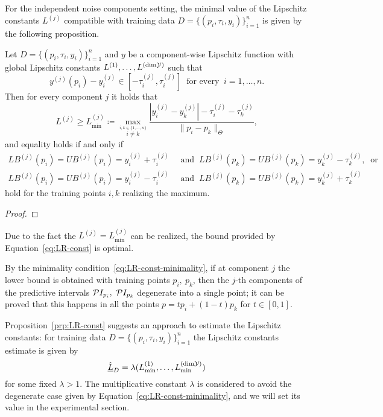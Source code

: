 For the independent noise components setting, the minimal value of the Lipschitz constants $L^{(j)}$ compatible with training data $D=\{ (p_i, \tau_i, y_i) \}_{i=1}^n$ is given by the following proposition.
\begin{prp} \label{prp:LR-const}
    Let $D=\{ (p_i, \tau_i, y_i) \}_{i=1}^n$ and $y$ be a component-wise Lipschitz function with global Lipschitz constants $L^{(1)},\dots, L^{(\text{dim}\mathcal Y)}$ such that 
    \[
        y^{(j)}(p_i) -y_i^{(j)} \in  [-\tau_i^{(j)},\tau_i^{(j)}] \ \text{ for every } \ i = 1, \dots, n.
    \]
    Then for every component $j$ it holds that
    \begin{equation}\label{eq:LR-const}
        L^{(j)} \geq L^{(j)}_{\min}\coloneq \max_{ \stackrel{i, k \in \{1, \dots, n\}}{i\neq k} } \frac{| y_i^{(j)} - y_k^{(j)} | - \tau_i^{(j)} - \tau_k^{(j)}}{\| p_i - p_k \|_\Theta},
    \end{equation}
    and equality holds if and only if
    \begin{equation}\label{eq:LR-const-minimality}
        \begin{aligned}
            LB^{(j)}(p_i) =UB^{(j)}(p_i) = y_i^{(j)} + \tau_i^{(j)}  \ &\text{ and }   \ LB^{(j)}(p_k) =UB^{(j)}(p_k) = y_k^{(j)} - \tau_k^{(j)}, \ \text{ or } \\
            LB^{(j)}(p_i) =UB^{(j)}(p_i) = y_i^{(j)} - \tau_i^{(j)}  \ &\text{ and }   \ LB^{(j)}(p_k) =UB^{(j)}(p_k) = y_k^{(j)} + \tau_k^{(j)}
        \end{aligned}
    \end{equation}
    hold for the training points $i,k$ realizing the maximum. 
\end{prp}
\begin{proof}
\end{proof}
\begin{rmk}
Due to the fact the $L^{(j)}=L^{(j)}_{\min}$ can be realized, the bound provided by Equation~\eqref{eq:LR-const} is optimal. 
\end{rmk}
\begin{rmk}
By the minimality condition~\eqref{eq:LR-const-minimality}, if at component $j$ the lower bound is obtained with training points $p_i, \ p_k$, then the $j$-th components of the predictive intervals $\mathcal PI_{p_i},\ \mathcal PI_{p_k}$ degenerate into a single point; it can be proved that this happens in all the points $p = t p_i + (1-t) p_k$ for $t \in [0,1]$. 
\end{rmk}

Proposition~\ref{prp:LR-const} suggests an approach to estimate the Lipschitz constants: for training data $D=\{ (p_i, \tau_i, y_i) \}_{i=1}^n$ the Lipschitz constants estimate is given by 
\begin{equation}\label{eq:lips-const}
    \hat{\underline{L}}_D = \lambda ( L^{(1)}_{\min}, \dots, L^{(\text{dim}\mathcal Y)}_{\min})
\end{equation} for some fixed $\lambda > 1$. 
The multiplicative constant $\lambda$ is considered to avoid the degenerate case given by Equation~\eqref{eq:LR-const-minimality}, and we will set its value in the experimental section.